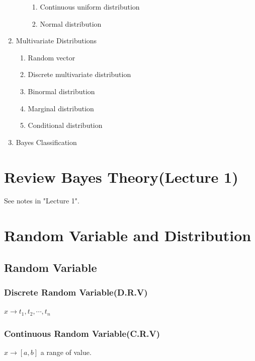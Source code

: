 \documentclass{article}
\begin{document}
\begin{enumerate}
\begin{enumerate}
\begin{enumerate}
                    \item Continuous uniform distribution
                    \item Normal distribution
                \end{enumerate}
        \end{enumerate}
    \item Multivariate Distributions
        \begin{enumerate}
            \item Random vector
            \item Discrete multivariate distribution
            \item Binormal distribution
            \item Marginal distribution
            \item Conditional distribution
        \end{enumerate}
    \item Bayes Classification
\end{enumerate}

\section{Review Bayes Theory(Lecture 1)}
See notes in "Lecture 1".
\section{Random Variable and Distribution} 
    \subsection{Random Variable}{
        \subsubsection{Discrete Random Variable(D.R.V)}{
            $ x\rightarrow t_1, t_2, \cdots, t_n$
        }
        \subsubsection{Continuous Random Variable(C.R.V)}{
            $ x\rightarrow [a, b]$ a range of value.
        }
    }
\end{document}
